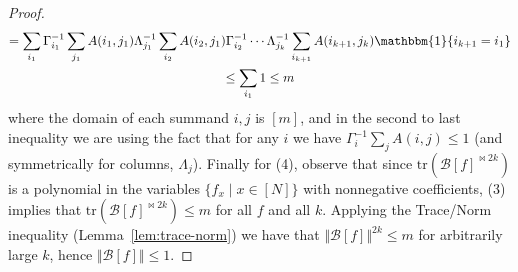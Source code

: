 \documentclass[11pt]{article}
\newcommand{\norm}[1]{\Vert #1 \Vert}
\newcommand{\N}{[N]}
\begin{document}
\begin{proof}
\begin{gather*}
 = \sum_{i_1} \Gamma_{i_1}^{-1} \sum_{j_1} A(i_1,j_1) \Lambda_{j_1}^{-1} \sum_{i_2} A(i_2,j_1)  \Gamma_{i_2}^{-1} \cdots \Lambda_{j_k}^{-1}\sum_{i_{k+1}}A(i_{k+1},j_k) \mathbbm{1}\{i_{k+1} = i_1\}\\
 \leq \sum_{i_1} 1 \leq m
\end{gather*}
where the domain of each summand $i,j$ is $[m]$, and in the second to last inequality we are using the fact that for any $i$ we have $\Gamma_i^{-1} \sum_{j} A(i,j) \leq 1$ (and symmetrically for columns, $\Lambda_j$). Finally for (4), observe that since $\mathrm{tr}(\mathcal{B}[f]^{\bowtie 2k})$ is a polynomial in the variables $\{f_x \mid x \in \N\}$ with nonnegative coefficients, (3) implies that $\mathrm{tr}(\mathcal{B}[f]^{\bowtie 2k}) \leq m$ for all $f$ and all $k$. Applying the Trace/Norm inequality (Lemma~\ref{lem:trace-norm}) we have that $\norm{\mathcal{B}[f]}^{2k} \leq m$ for arbitrarily large $k$, hence $\norm{\mathcal{B}[f]} \leq 1$.
\end{proof}
\end{document}
